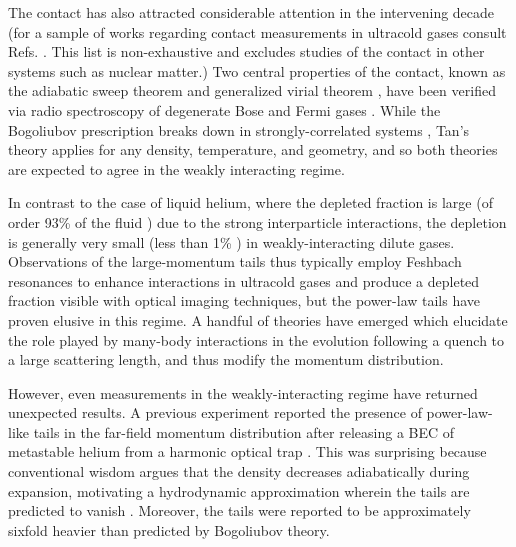 	The contact has also attracted considerable attention in the intervening decade (for a sample of works regarding contact measurements in ultracold gases consult Refs. \cite{Stewart10,Tan08_momentum,Tan08_energetics,Tan08_virial, Braaten10,Braaten11,Colussi20,Makotyn14,Eigen18,Decamp18,Smith14,Chang16,Qu16,Wild12,Hoinka15,Rakhimov20,Braaten08,Smith14,Kuhnle11,Sagi12,Fletcher17,Mukherjee19,Carcy19,Zhang09,Combescot09,Werner12_boson,Werner12_fermion}. This list is non-exhaustive and excludes studies of the contact in other systems such as nuclear matter.)
	Two central properties of the contact, known as the adiabatic sweep theorem and generalized virial theorem \cite{Tan08_momentum,Tan08_virial}, have been verified via radio spectroscopy \cite{Baym07,Punk07,Braaten10} of degenerate Bose \cite{Wild12} and Fermi gases \cite{Stewart10,Sagi12}. 
	While the Bogoliubov prescription breaks down in strongly-correlated systems \cite{Lopes17_quasiparticle}, Tan’s theory applies for any density, temperature, and geometry, and so both theories are expected to agree in the weakly interacting regime.

	In contrast to the case of liquid helium, where the depleted fraction is large (of order 93\% of the fluid \cite{Dmowski17,Glyde00,Moroni04}) due to the strong interparticle interactions, the depletion is generally very small (less than 1\% \cite{Lopes17_depletion,Chang16}) in weakly-interacting dilute gases.
	Observations of the large-momentum tails thus typically employ Feshbach resonances to enhance interactions in ultracold gases and produce a depleted fraction visible with optical imaging techniques, but the power-law tails have proven elusive \cite{Makotyn14,Eigen18} in this regime. 
	A handful of theories have emerged \cite{Kira15_coherent,Colussi20,Smith14} which elucidate the role played by many-body interactions in the evolution following a quench to a large scattering length, and thus modify the momentum distribution.

	However, even measurements in the weakly-interacting regime have returned unexpected results.
	A previous experiment reported the presence of power-law-like tails in the far-field momentum distribution after releasing a BEC of metastable helium from a harmonic optical trap \cite{Chang16}.
	This was surprising because conventional wisdom argues that the density decreases adiabatically during expansion, motivating a hydrodynamic approximation wherein the tails are predicted to vanish \cite{Xu06}. 
	Moreover, the tails were reported to be approximately sixfold heavier than predicted by Bogoliubov theory.
	

